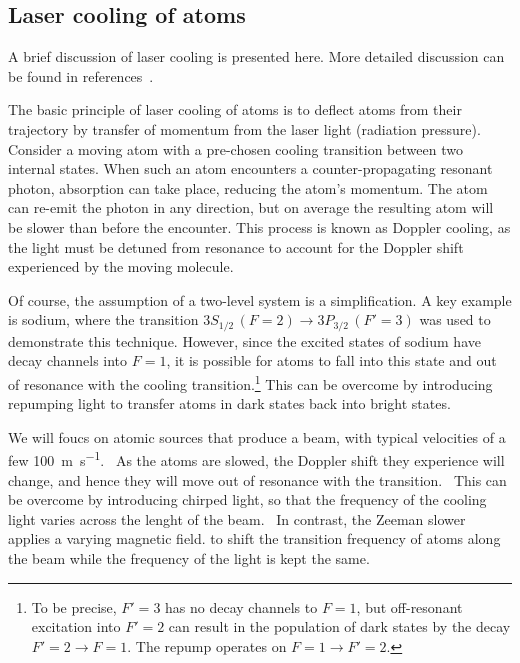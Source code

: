 \subsection{Laser cooling of atoms}

A brief discussion of laser cooling is presented here. More detailed discussion
can be found in references~\cite{Metcalf1999,RevModPhys.70.721,McCarron_2018}.

The basic principle of laser cooling of atoms is to deflect atoms from their
trajectory by transfer of momentum from the laser light (radiation
pressure).~\cite{RevModPhys.70.721} Consider a moving atom with a
pre-chosen cooling transition between two internal states.  When such an atom
encounters a counter-propagating resonant photon, absorption can take place,
reducing the atom's momentum. The atom can re-emit the photon in any direction,
but on average the resulting atom will be slower than before the encounter.
This process is known as Doppler cooling, as the light must be detuned from
resonance to account for the Doppler shift experienced by the moving
molecule.~\cite{Metcalf1999}

Of course, the assumption of a two-level system is a simplification. A key
example is sodium, where the transition $3S_{1/2}\, (F=2) \rightarrow 3P_{3/2}\,
(F'=3)$ was used to demonstrate this technique. However, since the excited
states of sodium have decay channels into $F=1$, it is possible for atoms to
fall into this state and out of resonance with the cooling
transition.\footnote{To be precise, $F'=3$ has no decay channels to $F=1$, but
off-resonant excitation into $F'=2$ can result in the population of dark states
by the decay $F'=2 \rightarrow F=1$. The repump operates on $F=1\rightarrow
F'=2$.} This can be overcome by introducing repumping light to transfer atoms in
dark states back into bright states.~\cite{RevModPhys.70.721} 

We will foucs on atomic sources that produce a beam, with typical velocities of
a few \SI{100}{\metre\per\second}.~\cite{Metcalf1999}  As the atoms are slowed,
the Doppler shift they experience will change, and hence they will move out of
resonance with the transition.~\cite{RevModPhys.70.721} This can be overcome by
introducing chirped light, so that the frequency of the cooling light varies
across the lenght of the beam.~\cite{Prodan1984} In contrast, the Zeeman slower
applies a varying magnetic field. to shift the transition frequency of atoms
along the beam while the frequency of the light is kept the same.

